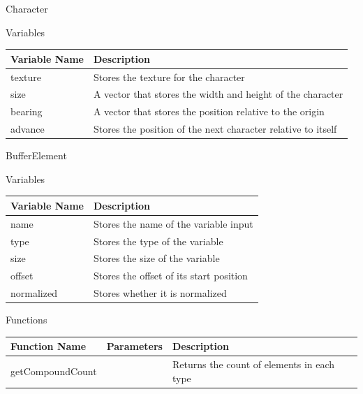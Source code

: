 \documentclass{article}
\begin{document}
                Character
                \begin{center}
                    Variables
                    \begin{tabular}{ | m{} | m{} | }
                        \hline
                        \textbf{Variable Name} & \textbf{Description} \\
                        \hline
                        texture & Stores the texture for the character \\
                        \hline
                        size & A vector that stores the width and height of the character \\
                        \hline
                        bearing & A vector that stores the position relative to the origin \\
                        \hline
                        advance & Stores the position of the next character relative to itself\\
                        \hline
                    \end{tabular}
                \end{center}
                BufferElement
                \begin{center}
                    Variables
                    \begin{tabular}{ | m{} | m{} | }
                        \hline
                        \textbf{Variable Name} & \textbf{Description} \\
                        \hline
                        name & Stores the name of the variable input \\
                        \hline
                        type & Stores the type of the variable \\
                        \hline
                        size & Stores the size of the variable \\
                        \hline
                        offset & Stores the offset of its start position \\
                        \hline
                        normalized & Stores whether it is normalized \\
                        \hline
                    \end{tabular}
                    Functions
                    \begin{tabular}{ | m{} | m{}| m{} | }
                        \hline
                        \textbf{Function Name} & \textbf{Parameters} & \textbf{Description} \\
                        \hline
                        getCompoundCount & & Returns the count of elements in each type \\
                        \hline
                    \end{tabular}
                \end{center}
\end{document}
